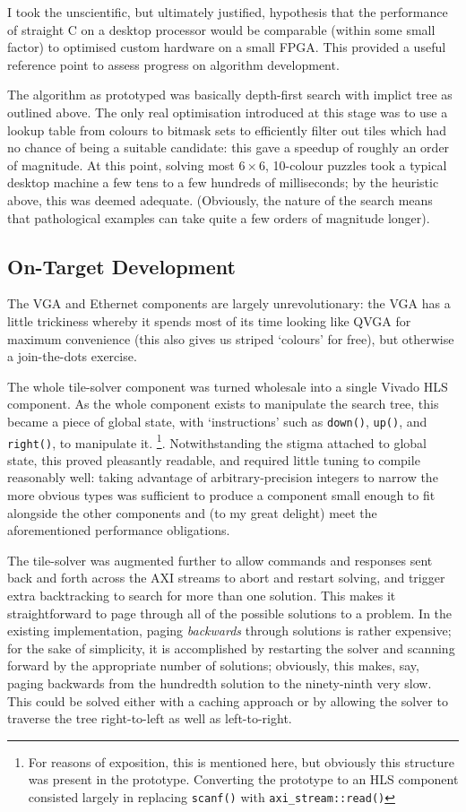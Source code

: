 \documentclass[a4paper,12pt]{article}
\begin{document}
I took the unscientific, but ultimately justified, hypothesis that the
performance of straight C on a desktop processor would be comparable
(within some small factor) to optimised custom hardware on a small
FPGA. This provided a useful reference point to assess progress on
algorithm development.

The algorithm as prototyped was basically depth-first search with
implict tree as outlined above. The only real optimisation introduced
at this stage was to use a lookup table from colours to bitmask sets
to efficiently filter out tiles which had no chance of being a
suitable candidate: this gave a speedup of roughly an order of
magnitude. At this point, solving most $6 \times 6$, 10-colour puzzles
took a typical desktop machine a few tens to a few hundreds of
milliseconds; by the heuristic above, this was deemed
adequate. (Obviously, the nature of the search means that pathological
examples can take quite a few orders of magnitude longer).

\subsection{On-Target Development}

The VGA and Ethernet components are largely unrevolutionary: the VGA
has a little trickiness whereby it spends most of its time looking
like QVGA for maximum convenience (this also gives us striped
`colours' for free), but otherwise a join-the-dots exercise.

The whole tile-solver component was turned wholesale into a single
Vivado HLS component. As the whole component exists to manipulate the
search tree, this became a piece of global state, with `instructions'
such as \texttt{down()}, \texttt{up()}, and \texttt{right()}, to
manipulate it.
\footnote{For reasons of exposition, this is mentioned here, but
  obviously this structure was present in the prototype. Converting
  the prototype to an HLS component consisted largely in replacing
  \texttt{scanf()} with \texttt{axi\_stream::read()}}.
Notwithstanding the stigma attached to global state, this proved
pleasantly readable, and required little tuning to compile reasonably
well: taking advantage of arbitrary-precision integers to narrow the
more obvious types was sufficient to produce a component small enough
to fit alongside the other components and (to my great delight) meet
the aforementioned performance obligations.

The tile-solver was augmented further to allow commands and responses
sent back and forth across the AXI streams to abort and restart
solving, and trigger extra backtracking to search for more than one
solution. This makes it straightforward to page through all of the
possible solutions to a problem. In the existing implementation,
paging \emph{backwards} through solutions is rather expensive; for the
sake of simplicity, it is accomplished by restarting the solver and
scanning forward by the appropriate number of solutions; obviously,
this makes, say, paging backwards from the hundredth solution to the
ninety-ninth very slow. This could be solved either with a caching
approach or by allowing the solver to traverse the tree right-to-left
as well as left-to-right.
\end{document}

